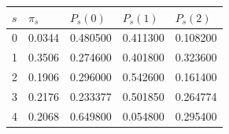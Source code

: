 \begin{tabular}{lllll}
\toprule
$s$ & $\pi_s$ & $P_s(0)$ & $P_s(1)$ & $P_s(2)$ \\
\midrule
0 & 0.0344 & 0.480500 & 0.411300 & 0.108200 \\
1 & 0.3506 & 0.274600 & 0.401800 & 0.323600 \\
2 & 0.1906 & 0.296000 & 0.542600 & 0.161400 \\
3 & 0.2176 & 0.233377 & 0.501850 & 0.264774 \\
4 & 0.2068 & 0.649800 & 0.054800 & 0.295400 \\
\bottomrule
\end{tabular}
